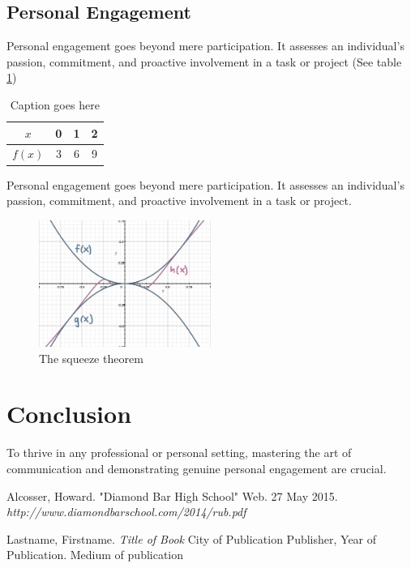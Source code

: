 \documentclass[11pt]{article}
\begin{document}
\subsection{Personal Engagement}

Personal engagement goes beyond mere participation. It assesses an individual's passion, commitment, and proactive involvement in a task or project (See table \ref{table_functions})

\begin{table}[H]
	\centering

	\begin{tabular}{|c|c|c|c|} \hline
		$ x $   & 0 & 1 & 2\\ \hline
		$ f(x)$ & 3 & 6 & 9\\ \hline
	\end{tabular}
	\caption{Caption goes here}
	\label{table_functions}
\end{table}

Personal engagement goes beyond mere participation. It assesses an individual's passion, commitment, and proactive involvement in a task or project.

\begin{figure}[H]
	\centering
	
	\includegraphics[width=0.5\textwidth]{limit}
	\caption{The squeeze theorem}

\end{figure}

\section{Conclusion}

To thrive in any professional or personal setting, mastering the art of communication and demonstrating genuine personal engagement are crucial. \cite{ref_diamond_bar_school}

\pagebreak
\begin{thebibliography}{}

Alcosser, Howard. 
"Diamond Bar High School"
Web. 27 May 2015.
\textit{http://www.diamondbarschool.com/2014/rub.pdf}

Lastname, Firstname.
\textit{Title of Book}
City of Publication
Publisher,
Year of Publication.
Medium of publication

\end{thebibliography}
\end{document}
